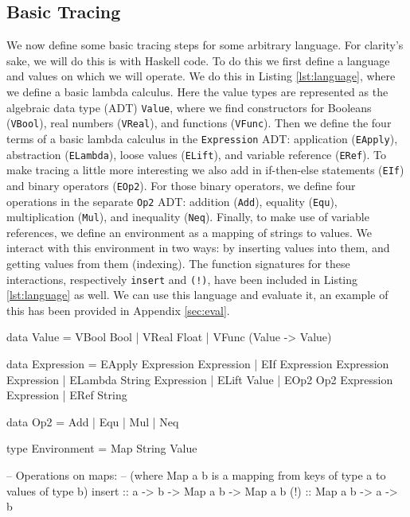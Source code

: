     \subsection{Basic Tracing} \label{sec:steps}
        We now define some basic tracing steps for some arbitrary language.
        For clarity's sake, we will do this is with Haskell code.
        To do this we first define a language and values on which we will operate.
        We do this in Listing \ref{lst:language}, where we define a basic lambda calculus.
        Here the value types are represented as the algebraic data type (ADT) \texttt{Value}, where we find constructors for Booleans (\texttt{VBool}), real numbers (\texttt{VReal}), and functions (\texttt{VFunc}).
        Then we define the four terms of a basic lambda calculus in the \texttt{Expression} ADT: application (\texttt{EApply}), abstraction (\texttt{ELambda}), loose values (\texttt{ELift}), and variable reference (\texttt{ERef}).
        To make tracing a little more interesting we also add in if-then-else statements (\texttt{EIf}) and binary operators (\texttt{EOp2}).
        For those binary operators, we define four operations in the separate \texttt{Op2} ADT: addition (\texttt{Add}), equality (\texttt{Equ}), multiplication (\texttt{Mul}), and inequality (\texttt{Neq}).
        Finally, to make use of variable references, we define an environment as a mapping of strings to values.
        We interact with this environment in two ways: by inserting values into them, and getting values from them (indexing).
        The function signatures for these interactions, respectively \texttt{insert} and \texttt{(!)}, have been included in Listing \ref{lst:language} as well.
        We can use this language and evaluate it, an example of this has been provided in Appendix \ref{sec:eval}.

        \begin{haskell}[caption=Minimal lambda calculus with added if-then-else and binary operators, label=lst:language, gobble=12]
            data Value = VBool Bool | VReal Float | VFunc (Value -> Value)

            data Expression
                = EApply  Expression Expression
                | EIf     Expression Expression Expression
                | ELambda String     Expression
                | ELift   Value
                | EOp2    Op2        Expression Expression
                | ERef    String

            data Op2 = Add | Equ | Mul | Neq

            type Environment = Map String Value

            -- Operations on maps:
            -- (where Map a b is a mapping from keys of type a to values of type b)
            insert :: a -> b -> Map a b -> Map a b
            (!) :: Map a b -> a -> b
        \end{haskell}

